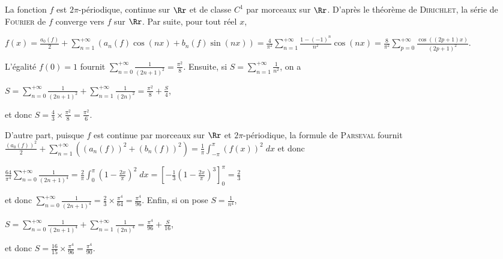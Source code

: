 {{\begin{enumerate}
La fonction $f$ est $2\pi$-périodique, continue sur $\Rr$ et de classe $C^1$ par morceaux sur $\Rr$. D'après le théorème de \textsc{Dirichlet}, la série de \textsc{Fourier} de $f$ converge vers $f$ sur $\Rr$. Par suite, pour tout réel $x$, 

\begin{center}
$f(x)=\frac{a_0(f)}{2}+\sum_{n=1}^{+\infty}(a_n(f)\cos(nx)+b_n(f)\sin(nx))=\frac{4}{\pi^2}\sum_{n=1}^{+\infty}\frac{1-(-1)^n}{n^2}\cos(nx)=\frac{8}{\pi^2}\sum_{p=0}^{+\infty}\frac{\cos((2p+1)x)}{(2p+1)^2}$.
\end{center}

\begin{center}
\end{center}

L'égalité $f(0)=1$ fournit $\sum_{n=0}^{+\infty}\frac{1}{(2n+1)^2}=\frac{\pi^2}{8}$. Ensuite, si $S=\sum_{n=1}^{+\infty}\frac{1}{n^2}$, on a

\begin{center}
$S=\sum_{n=0}^{+\infty}\frac{1}{(2n+1)^2}+\sum_{n=1}^{+\infty}\frac{1}{(2n)^2}=\frac{\pi^2}{8}+\frac{S}{4}$,
\end{center}

et donc $S=\frac{4}{3}\times\frac{\pi^2}{8}=\frac{\pi^2}{6}$.

D'autre part, puisque $f$ est continue par morceaux sur $\Rr$ et $2\pi$-périodique, la formule de \textsc{Parseval} fournit $\frac{(a_0(f))^2}{2}+\sum_{n=1}^{+\infty}((a_n(f))^2+(b_n(f))^2)=\frac{1}{\pi}\int_{-\pi}^{\pi}(f(x))^2\;dx$ et donc

\begin{center}
$\frac{64}{\pi^4}\sum_{n=0}^{+\infty}\frac{1}{(2n+1)^4}=\frac{2}{\pi}\int_{0}^{\pi}\left(1-\frac{2x}{\pi}\right)^2\;dx=\left[-\frac{1}{3}\left(1-\frac{2x}{\pi}\right)^3\right]_0^\pi=\frac{2}{3}$
\end{center}

et donc $\sum_{n=0}^{+\infty}\frac{1}{(2n+1)^4}=\frac{2}{3}\times\frac{\pi^4}{64}=\frac{\pi^4}{96}$. Enfin, si on pose $S=\frac{1}{n^4}$,

\begin{center}
$S=\sum_{n=0}^{+\infty}\frac{1}{(2n+1)^4}+\sum_{n=1}^{+\infty}\frac{1}{(2n)^4}=\frac{\pi^4}{96}+\frac{S}{16}$,
\end{center}

et donc $S=\frac{16}{15}\times\frac{\pi^4}{96}=\frac{\pi^4}{90}$.


\end{enumerate}}}
